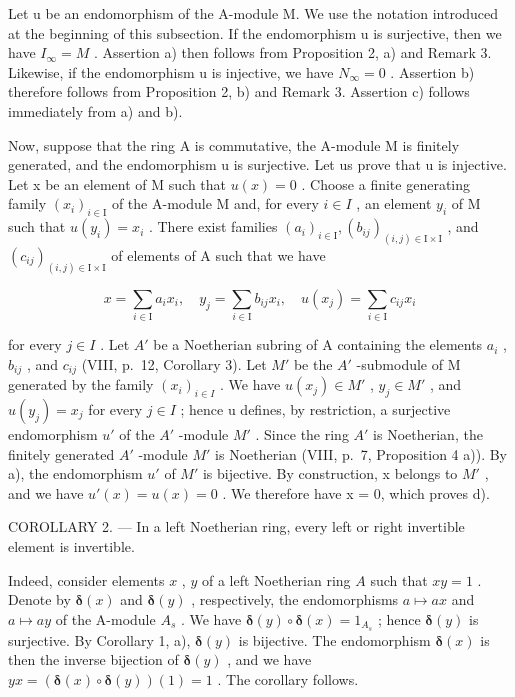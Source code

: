 Let u be an endomorphism of the A-module M. We use the notation introduced at the beginning of this subsection. If the endomorphism u is surjective, then we have \(I_{\infty} = M\) . Assertion a) then follows from Proposition 2, a) and Remark 3. Likewise, if the endomorphism u is injective, we have \(N_{\infty} = 0\) . Assertion b) therefore follows from Proposition 2, b) and Remark 3. Assertion c) follows immediately from a) and b).

Now, suppose that the ring A is commutative, the A-module M is finitely generated, and the endomorphism u is surjective. Let us prove that u is injective. Let x be an element of M such that \(u(x) = 0\) . Choose a finite generating family \((x_{i})_{i \in \mathrm{I}}\) of the A-module M and, for every \(i \in I\) , an element \(y_{i}\) of M such that \(u(y_{i}) = x_{i}\) . There exist families \((a_{i})_{i \in \mathrm{I}}, (b_{ij})_{(i,j) \in \mathrm{I} \times \mathrm{I}}\) , and \((c_{ij})_{(i,j) \in \mathrm{I} \times \mathrm{I}}\) of elements of A such that we have

\[
x = \sum_ {i \in \mathrm{I}} a _ {i} x _ {i}, \quad y _ {j} = \sum_ {i \in \mathrm{I}} b _ {i j} x _ {i}, \quad u (x _ {j}) = \sum_ {i \in \mathrm{I}} c _ {i j} x _ {i}
\]

for every \(j \in I\) . Let \(A'\) be a Noetherian subring of A containing the elements \(a_i\) , \(b_{ij}\) , and \(c_{ij}\) (VIII, p.~12, Corollary 3). Let \(M'\) be the \(A'\) -submodule of M generated by the family \((x_i)_{i \in I}\) . We have \(u(x_j) \in M'\) , \(y_j \in M'\) , and \(u(y_j) = x_j\) for every \(j \in I\) ; hence u defines, by restriction, a surjective endomorphism \(u'\) of the \(A'\) -module \(M'\) . Since the ring \(A'\) is Noetherian, the finitely generated \(A'\) -module \(M'\) is Noetherian (VIII, p.~7, Proposition 4 a)). By a), the endomorphism \(u'\) of \(M'\) is bijective. By construction, x belongs to \(M'\) , and we have \(u'(x) = u(x) = 0\) . We therefore have x = 0, which proves d).

COROLLARY 2. --- In a left Noetherian ring, every left or right invertible element is invertible.

Indeed, consider elements \(x\) , \(y\) of a left Noetherian ring \(A\) such that \(xy = 1\) . Denote by \(\pmb{\delta}(x)\) and \(\pmb{\delta}(y)\) , respectively, the endomorphisms \(a \mapsto ax\) and \(a \mapsto ay\) of the A-module \(A_s\) . We have \(\pmb{\delta}(y) \circ \pmb{\delta}(x) = 1_{A_s}\) ; hence \(\pmb{\delta}(y)\) is surjective. By Corollary 1, a), \(\pmb{\delta}(y)\) is bijective. The endomorphism \(\pmb{\delta}(x)\) is then the inverse bijection of \(\pmb{\delta}(y)\) , and we have \(yx = (\pmb{\delta}(x) \circ \pmb{\delta}(y))(1) = 1\) . The corollary follows.
